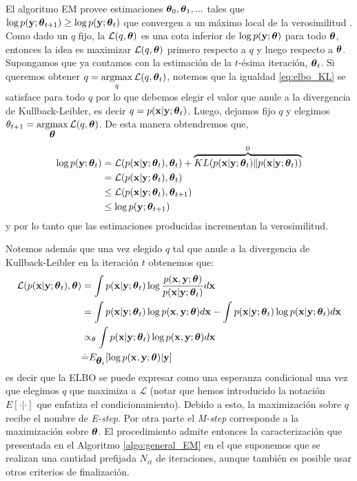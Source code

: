 El algoritmo EM provee estimaciones $\mbox{\boldmath$ \theta $}_0, \mbox{\boldmath$ \theta $}_1, ...$ tales que $\log p(\mathbf{y}; \mbox{\boldmath$ \theta $}_{t+1}) \geq \log p(\mathbf{y}; \mbox{\boldmath$ \theta $}_t)$ que convergen a un máximo local de la verosimilitud \citep{Wu1983}. Como dado un $q$ fijo, la $\mathcal{L}(q,\mbox{\boldmath$ \theta $})$ es una cota inferior de $\log p(\mathbf{y}; \mbox{\boldmath$ \theta $})$ para todo $\mbox{\boldmath$ \theta $}$, entonces la idea es maximizar $\mathcal{L}(q,\mbox{\boldmath$ \theta $})$ primero respecto a $q$ y luego respecto a $\mbox{\boldmath$ \theta $}$. Supongamos que ya contamos con la estimación de la $t$-ésima iteración, $\mbox{\boldmath$ \theta $}_t$. Si queremos obtener $q = \operatorname*{argmax}\limits_{q}\mathcal{L}(q,\mbox{\boldmath$ \theta $}_t)$, notemos que la igualdad \ref{eq:elbo_KL} se satisface para todo $q$ por lo que debemos elegir el valor que anule a la divergencia de Kullback-Leibler, es decir $q = p(\mathbf{x} | \mathbf{y}; \mbox{\boldmath$ \theta $}_t)$. Luego, dejamos fijo $q$ y elegimos $\theta_{t+1} = \operatorname*{argmax}\limits_{\mbox{\boldmath$ \theta $}} \mathcal{L}(q,\mbox{\boldmath$ \theta $})$. De esta manera obtendremos que,
\begin{align*}
    \log p(\mathbf{y}; \mbox{\boldmath$ \theta $}_t) &= \mathcal{L}(p(\mathbf{x} | \mathbf{y}; \mbox{\boldmath$ \theta $}_t), \mbox{\boldmath$ \theta $}_t) + \overbrace{KL(p(\mathbf{x} | \mathbf{y}; \mbox{\boldmath$ \theta $}_t) \rVert p(\mathbf{x} | \mathbf{y}; \mbox{\boldmath$ \theta $}_t))}^{0} \\
    &= \mathcal{L}(p(\mathbf{x} | \mathbf{y}; \mbox{\boldmath$ \theta $}_t), \mbox{\boldmath$ \theta $}_t) \\
    &\leq \mathcal{L}(p(\mathbf{x} | \mathbf{y}; \mbox{\boldmath$ \theta $}_t), \mbox{\boldmath$ \theta $}_{t+1}) \\
    &\leq \log p(\mathbf{y}; \mbox{\boldmath$ \theta $}_{t+1})
\end{align*}
y por lo tanto que las estimaciones producidas incrementan la verosimilitud.

Notemos además que una vez elegido $q$ tal que anule a la divergencia de Kullback-Leibler en la iteración $t$ obtenemos que:
\begin{align*}
    \mathcal{L}(p(\mathbf{x} | \mathbf{y}; \mbox{\boldmath$ \theta $}_t), \mbox{\boldmath$ \theta $}) &= \int p(\mathbf{x} | \mathbf{y}; \mbox{\boldmath$ \theta $}_t) \log \frac{p(\mathbf{x}, \mathbf{y}; \mbox{\boldmath$ \theta $})}{p(\mathbf{x} | \mathbf{y}; \mbox{\boldmath$ \theta $}_t)} d\mathbf{x} \\
    &= \int p(\mathbf{x} | \mathbf{y}; \mbox{\boldmath$ \theta $}_t) \log p(\mathbf{x}, \mathbf{y}; \mbox{\boldmath$ \theta $}) d\mathbf{x} - \int p(\mathbf{x} | \mathbf{y}; \mbox{\boldmath$ \theta $}_t) \log p(\mathbf{x} | \mathbf{y}; \mbox{\boldmath$ \theta $}_t) d\mathbf{x} \\
    &\propto_{\theta} \int p(\mathbf{x} | \mathbf{y}; \mbox{\boldmath$ \theta $}_t) \log p(\mathbf{x}, \mathbf{y}; \mbox{\boldmath$ \theta $}) d\mathbf{x} \\
    &\dot{=} E_{\mbox{\boldmath$ \theta $}_t}[\log p(\mathbf{x}, \mathbf{y}; \mbox{\boldmath$ \theta $})| \mathbf{y}]
\end{align*}
es decir que la ELBO se puede expresar como una esperanza condicional una vez que elegimos $q$ que maximiza a $\mathcal{L}$ (notar que hemos introducido la notación $E[\cdot | \cdot]$ que enfatiza el condicionamiento). Debido a esto, la maximización sobre $q$ recibe el nombre de \textit{E-step}. Por otra parte el \textit{M-step} corresponde a la maximización sobre $\mbox{\boldmath$ \theta $}$. El procedimiento admite entonces la caracterización que presentada en el Algoritmo \ref{algo:general_EM} en el que suponemos que se realizan una cantidad prefijada $N_{it}$ de iteraciones, aunque también es posible usar otros criterios de finalización.

